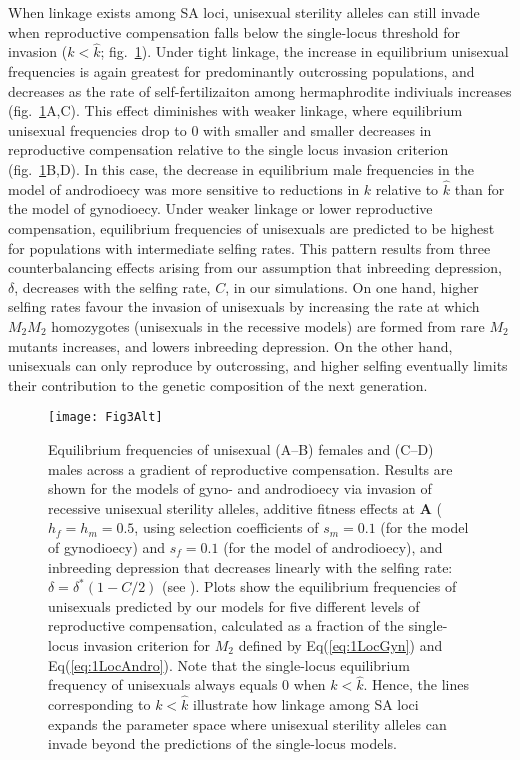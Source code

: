 \documentclass[9pt,twocolumn,twoside,lineno]{gsajnl}
\begin{document}
When linkage exists among SA loci, unisexual sterility alleles can still invade when reproductive compensation falls below the single-locus threshold for invasion ($k < \hat{k}$; fig.~\ref{fig:eqFreq}). Under tight linkage, the increase in equilibrium unisexual frequencies is again greatest for predominantly outcrossing populations, and decreases as the rate of self-fertilizaiton among hermaphrodite indiviuals increases (fig.~\ref{fig:eqFreq}A,C). This effect diminishes with weaker linkage, where equilibrium unisexual frequencies drop to $0$ with smaller and smaller decreases in reproductive compensation relative to the single locus invasion criterion (fig.~\ref{fig:eqFreq}B,D). In this case, the decrease in equilibrium male frequencies in the model of androdioecy was more sensitive to reductions in $k$ relative to $\hat{k}$ than for the model of gynodioecy. Under weaker linkage or lower reproductive compensation, equilibrium frequencies of unisexuals are predicted to be highest for populations with intermediate selfing rates. This pattern results from three counterbalancing effects arising from our assumption that inbreeding depression, $\delta$, decreases with the selfing rate, $C$, in our simulations. On one hand, higher selfing rates favour the invasion of unisexuals by increasing the rate at which $M_2 M_2$ homozygotes (unisexuals in the recessive models) are formed from rare $M_2$ mutants increases, and lowers inbreeding depression. On the other hand, unisexuals can only reproduce by outcrossing, and higher selfing eventually limits their contribution to the genetic composition of the next generation. 


\begin{figure}[htbp]
\centering
\texttt{[image: Fig3Alt]}
\caption{Equilibrium frequencies of unisexual (A--B) females and (C--D) males across a gradient of reproductive compensation. Results are shown for the models of gyno- and androdioecy via invasion of recessive unisexual sterility alleles, additive fitness effects at $\mathbf{A}$ ($h_f = h_m = 0.5$, using selection coefficients of $s_m = 0.1$ (for the model of gynodioecy) and $s_f = 0.1$ (for the model of androdioecy), and inbreeding depression that decreases linearly with the selfing rate: $\delta = \delta^\ast(1 - C/2)$ (see ). Plots show the equilibrium frequencies of unisexuals predicted by our models for five different levels of reproductive compensation, calculated as a fraction of the single-locus invasion criterion for $M_2$ defined by Eq(\ref{eq:1LocGyn}) and Eq(\ref{eq:1LocAndro}). Note that the single-locus equilibrium frequency of unisexuals always equals $0$ when $k < \hat{k}$. Hence, the lines corresponding to $k < \hat{k}$ illustrate how linkage among SA loci expands the parameter space where unisexual sterility alleles can invade beyond the predictions of the single-locus models.}
\label{fig:eqFreq}
\end{figure}
\end{document}
